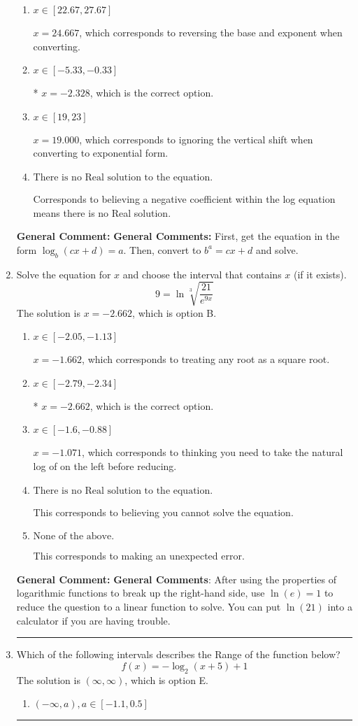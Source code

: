 \documentclass{extbook}[14pt]
\newcommand{\litem}[1]{\item #1

\rule{\textwidth}{0.4pt}}
\begin{document}
\begin{enumerate}
{\begin{enumerate}[label=\Alph*.]
$x = 29.333$, which corresponds to reversing the base and exponent when converting and reversing the value with $x$.
\item \( x \in [22.67, 27.67] \)

$x = 24.667$, which corresponds to reversing the base and exponent when converting.
\item \( x \in [-5.33, -0.33] \)

* $x = -2.328$, which is the correct option.
\item \( x \in [19, 23] \)

$x = 19.000$, which corresponds to ignoring the vertical shift when converting to exponential form.
\item \( \text{There is no Real solution to the equation.} \)

Corresponds to believing a negative coefficient within the log equation means there is no Real solution.
\end{enumerate}

\textbf{General Comment:} \textbf{General Comments:} First, get the equation in the form $\log_b{(cx+d)} = a$. Then, convert to $b^a = cx+d$ and solve.
}
\litem{
 Solve the equation for $x$ and choose the interval that contains $x$ (if it exists).
\[  9 = \ln{\sqrt[3]{\frac{21}{e^{9x}}}} \]The solution is \( x = -2.662 \), which is option B.\begin{enumerate}[label=\Alph*.]
\item \( x \in [-2.05, -1.13] \)

$x = -1.662$, which corresponds to treating any root as a square root.
\item \( x \in [-2.79, -2.34] \)

* $x = -2.662$, which is the correct option.
\item \( x \in [-1.6, -0.88] \)

$x = -1.071$, which corresponds to thinking you need to take the natural log of on the left before reducing.
\item \( \text{There is no Real solution to the equation.} \)

This corresponds to believing you cannot solve the equation.
\item \( \text{None of the above.} \)

This corresponds to making an unexpected error.
\end{enumerate}

\textbf{General Comment:} \textbf{General Comments}: After using the properties of logarithmic functions to break up the right-hand side, use $\ln(e) = 1$ to reduce the question to a linear function to solve. You can put $\ln(21)$ into a calculator if you are having trouble.
}
\litem{
Which of the following intervals describes the Range of the function below?
\[ f(x) = -\log_2{(x+5)}+1 \]The solution is \( (\infty, \infty) \), which is option E.\begin{enumerate}[label=\Alph*.]
\item \( (-\infty, a), a \in [-1.1, 0.5] \)


\end{enumerate}}
\end{enumerate}
\end{document}
